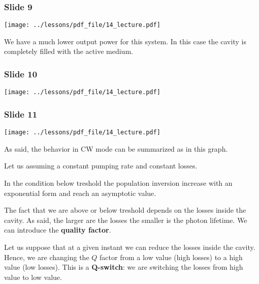 \documentclass[../main/main.tex]{subfiles}
\begin{document}
\subsubsection*{Slide 9}

\begin{minipage}[]{0.5\linewidth}
\centering
\texttt{[image: ../lessons/pdf\_file/14\_lecture.pdf]}
\end{minipage}
\hspace{0.3cm}\vspace{0.3cm}
\begin{minipage}[c]{0.47\linewidth}

We have a much lower output power for this system. In this case the cavity is completely filled with the active medium.

\end{minipage}

\subsubsection*{Slide 10}

\begin{minipage}[]{0.5\linewidth}
\centering
\texttt{[image: ../lessons/pdf\_file/14\_lecture.pdf]}
\end{minipage}
\hspace{0.3cm}\vspace{0.3cm}
\begin{minipage}[c]{0.47\linewidth}

\end{minipage}

\subsubsection*{Slide 11}

\begin{minipage}[]{0.5\linewidth}
\centering
\texttt{[image: ../lessons/pdf\_file/14\_lecture.pdf]}
\end{minipage}
\hspace{0.3cm}\vspace{0.3cm}
\begin{minipage}[c]{0.47\linewidth}

As said, the behavior in CW mode can be summarized as in this graph.

Let us assuming a constant pumping rate and constant losses.

In the condition below treshold the population inversion increase with an exponential form and reach an asymptotic value.

The fact that we are above or below treshold depends on the losses inside the cavity. As said, the larger are the losses the smaller is the photon lifetime. We can introduce the \textbf{quality factor}.

Let us suppose that at a given instant we can reduce the losses inside the cavity. Hence, we are changing the \( Q \) factor from a low value (high losses) to a high value (low losses). This is a \textbf{Q-switch}: we are switching the losses from high value to low value.
\end{minipage}
\end{document}
